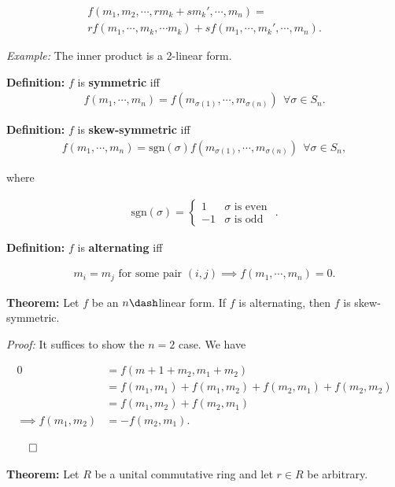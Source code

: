 \begin{align*}
f(
m_1, m_2, \cdots, rm_k + sm_k', \cdots, m_n
) = \\
r f(
    m_1, \cdots, m_k, \cdots m_k) + sf(m_1, \cdots, m_k', \cdots, m_n
)
.\end{align*}

\emph{Example:} The inner product is a 2-linear form.

\textbf{Definition:} \(f\) is \textbf{symmetric} iff
\begin{align*}
f(m_1, \cdots, m_n) = f(m_{\sigma(1)}, \cdots, m_{\sigma(n)}) ~~\forall \sigma \in S_n
.\end{align*}

\textbf{Definition:} \(f\) is \textbf{skew-symmetric} iff
\begin{align*}
f(m_1, \cdots, m_n) = \mathrm{sgn}(\sigma) f(m_{\sigma(1)}, \cdots, m_{\sigma(n)}) ~~\forall \sigma \in S_n
,\end{align*}

where

\begin{align*}
\mathrm{sgn}(\sigma) =
\begin{cases}
1 & \sigma \text{ is even } \\
-1 & \sigma \text{ is odd }
\end{cases}
.\end{align*}

\textbf{Definition:} \(f\) is \textbf{alternating} iff

\begin{align*}
m_i = m_j \text{ for some pair } (i, j) \implies f(m_1, \cdots, m_n) = 0
.\end{align*}

\textbf{Theorem:} Let \(f\) be an \(n\dash\)linear form. If \(f\) is
alternating, then \(f\) is skew-symmetric.

\emph{Proof:} It suffices to show the \(n=2\) case. We have

\begin{align*}
0
&= f(m+1 + m_2, m_1 + m_2) \\
&= f(m_1, m_1) + f(m_1, m_2) + f(m_2, m_1) + f(m_2, m_2) \\
&= f(m_1, m_2) + f(m_2, m_1)\\
\implies f(m_1, m_2) &= - f(m_2, m_1)
.\end{align*}

\(\qed\)

\textbf{Theorem:} Let \(R\) be a unital commutative ring and let
\(r\in R\) be arbitrary.

